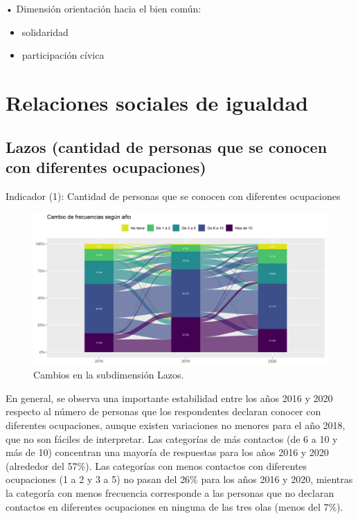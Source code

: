 \documentclass[
  12pt,
]{book}
\providecommand{\tightlist}{%
  \setlength{\itemsep}{0pt}\setlength{\parskip}{0pt}}
\begin{document}
• Dimensión orientación hacia el bien común:

\begin{itemize}
\tightlist
\item
  solidaridad
\item
  participación cívica
\end{itemize}

\hypertarget{relaciones-sociales-de-igualdad-1}{%
\section{Relaciones sociales de igualdad}\label{relaciones-sociales-de-igualdad-1}}

\hypertarget{lazos-cantidad-de-personas-que-se-conocen-con-diferentes-ocupaciones}{%
\subsection{Lazos (cantidad de personas que se conocen con diferentes ocupaciones)}\label{lazos-cantidad-de-personas-que-se-conocen-con-diferentes-ocupaciones}}

Indicador (1): Cantidad de personas que se conocen con diferentes ocupaciones

\begin{figure}[H]

{\centering \includegraphics[width=1\linewidth,height=1\textheight]{output/graphs/alluvial_lazos} 

}

\caption{Cambios en la subdimensión Lazos.}\label{fig:alluvial-lazos}
\end{figure}

En general, se observa una importante estabilidad entre los años 2016 y 2020 respecto al número de personas que los respondentes declaran conocer con diferentes ocupaciones, aunque existen variaciones no menores para el año 2018, que no son fáciles de interpretar. Las categorías de más contactos (de 6 a 10 y más de 10) concentran una mayoría de respuestas para los años 2016 y 2020 (alrededor del 57\%). Las categorías con menos contactos con diferentes ocupaciones (1 a 2 y 3 a 5) no pasan del 26\% para los años 2016 y 2020, mientras la categoría con menos frecuencia corresponde a las personas que no declaran contactos en diferentes ocupaciones en ninguna de las tres olas (menos del 7\%).
\end{document}
